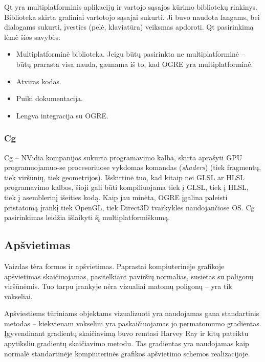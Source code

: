 Qt yra multiplatforminis aplikacijų ir vartojo sąsajos kūrimo bibliotekų
rinkinys. Biblioteka skirta grafiniai vartotojo sąsajai sukurti. Ji buvo
naudota langams, bei dialogams sukurti, įvesties (pelė, klaviatūra) veiksmas
apdoroti. Qt pasirinkimą lėmė šios savybės:

\begin{itemize}

\item
  Multiplatforminė biblioteka. Jeigu būtų pasirinkta ne multiplatforminė --
  būtų prarasta visa nauda, gaunama iš to, kad OGRE yra multiplatforminė.

\item
  Atviras kodas.

\item
  Puiki dokumentacija.

\item
  Lengva integracija su OGRE.

\end{itemize}

\subsubsection{Cg}

Cg -- NVidia kompanijos sukurta programavimo kalba, skirta aprašyti GPU
programuojamuo-se procesoriuose vykdomas komandas (\emph{shaders}) (tiek
fragmentų, tiek viršūnių, tiek geometrijos). Išskirtinė tuo, kad kitaip nei
GLSL ar HLSL programavimo kalbos, šioji gali būti kompiliuojama tiek į GLSL,
tiek į HLSL, tiek į asemblerinį išeities kodą. Kaip jau minėta, OGRE įgalina
paleisti pristatomą įrankį tiek OpenGL, tiek Direct3D tvarkykles naudojančiose
OS. Cg pasirinkimas leidžia išlaikyti šį multiplatformiškumą.

\subsection{Apšvietimas}

Vaizdas tėra formos ir apšvietimas. Paprastai kompiuterinėje grafikoje
apšvietimas skaičiuojamas, pasitelkiant paviršių normalias, susietas su
poligonų viršūnėmis. Tuo tarpu įrankyje nėra vizualiai matomų poligonų -- yra
tik vokseliai.

Apšviestiems tūriniams objektams vizualizuoti yra naudojamas gana standartinis
metodas -- kiekvienam vokseliui yra paskaičiuojamas jo permatomumo gradientas.
Įgyvendinant gradientų skaičiavimą buvo remtasi Harvey Ray ir kitų
\cite{gradients} pateiktu apytiksliu gradientų skaičiavimo metodu. Tas
gradientas yra naudojamas kaip normalė standartinėje kompiuterinės grafikos
apšvietimo schemos realizacijoje.

